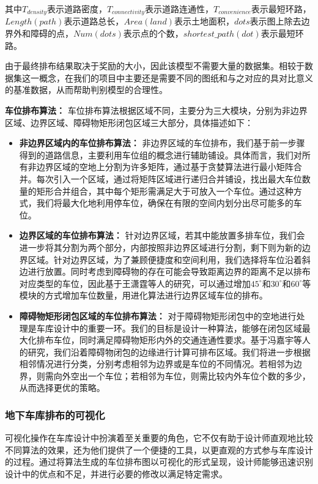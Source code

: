 其中$T_{density}$表示道路密度，$T_{connectivity}$表示道路连通性，$T_{convenience}$表示最短环路，$Length(path)$表示道路总长，$Area(land)$表示土地面积，$dots$表示图上除去边界外和障碍的点，$Num(dots)$表示点的个数，$shortest\_path(dot)$表示最短环路。

由于最终排布结果取决于奖励的大小，因此该模型不需要大量的数据集。相较于数据集这一概念，在我们的项目中主要还是需要不同的图纸和与之对应的具对比意义的基准数据，从而帮助判别模型的合理性。

{\bfseries 车位排布算法：}
车位排布算法根据区域不同，主要分为三大模块，分别为非边界区域、边界区域、障碍物矩形闭包区域三大部分，具体描述如下：
\begin{itemize}
  \item {\bfseries 非边界区域内的车位排布算法：}
  非边界区域的车位排布，我们基于前一步骤得到的道路信息，主要利用车位组的概念进行辅助铺设。具体而言，我们对所有非边界区域的空地上分割为许多矩阵，通过基于贪婪算法进行最小矩阵合并。每次引入一个区域，通过将矩阵区域进行递归合并铺设，找出最大车位数量的矩形合并组合，其中每个矩形需满足大于可放入一个车位。通过这种方式，我们将最大化地利用停车位，确保在有限的空间内划分出尽可能多的车位。
  \item {\bfseries 边界区域的车位排布算法：}
  针对边界区域，若其中能放置多排车位，我们会进一步将其分割为两个部分，内部按照非边界区域进行分割，剩下则为新的边界区域。针对边界区域，为了兼顾便捷度和空间利用，我们选择将车位沿着斜边进行放置。同时考虑到障碍物的存在可能会导致距离边界的距离不足以排布对应类型的车位，因此基于王潇霆\cite{1023719817.nh}等人的研究，可以通过增加$45^{\circ}$和$30^{\circ}$和$60^{\circ}$等模块的方式增加车位数量，用进化算法进行边界区域车位的排布。
  \item {\bfseries 障碍物矩形闭包区域的车位排布算法：}
  对于障碍物矩形闭包中的空地进行处理是车库设计中的重要一环。我们的目标是设计一种算法，能够在闭包区域最大化排布车位，同时满足障碍物矩形内外的交通连通性要求。基于冯嘉宇\cite{1022674189.nh}等人的研究，我们沿着障碍物闭包的边缘进行计算可排布区域。我们将进一步根据相邻情况进行分类，分别考虑相邻为边界或是车位的不同情况。若相邻为边界，则需向外空出一个车位；若相邻为车位，则需比较内外车位个数的多少，从而选择更优的策略。
\end{itemize}
\subsubsection{地下车库排布的可视化}
可视化操作在车库设计中扮演着至关重要的角色，它不仅有助于设计师直观地比较不同算法的效果，还为他们提供了一个便捷的工具，以更直观的方式参与车库设计的过程。通过将算法生成的车位排布图以可视化的形式呈现，设计师能够迅速识别设计中的优点和不足，并进行必要的修改以满足特定需求。

